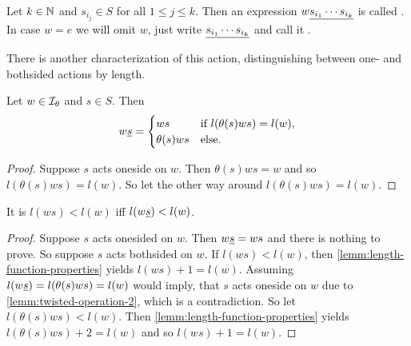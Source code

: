 \begin{defi}
	Let $k \in \mathbb{N}$ and $s_{i_j} \in S$ for all $1 \leq j \leq k$. Then an expression $w \underline{s_{i_1} \cdots s_{i_k}}$ is called . In case $w = e$ we will omit $w$, just write $\underline{s_{i_1} \cdots s_{i_k}}$ and call it .
\end{defi}

There is another characterization of this action, distinguishing between one- and bothsided actions by length.

\begin{lemm}
	Let $w \in \mathcal{I}_{\theta}$ and $s \in S$. Then
	$$ w \underline{s} = \begin{cases}
		ws & \textrm{if } l(\theta(s)ws) = l(w), \\
		\theta(s)ws & \textrm{else}. \\
	\end{cases} $$

	\begin{proof}
		Suppose $s$ acts oneside on $w$. Then $\theta(s)ws = w$ and so $l(\theta(s)ws) = l(w)$. So let the other way around $l(\theta(s)ws) = l(w)$. \todo
	\end{proof}
\end{lemm}

\begin{lemm}
	It is $l(ws) < l(w)$ iff $l(w \underline{s}) < l(w)$.

	\begin{proof}
		Suppose $s$ acts onesided on $w$. Then $w \underline{s} = ws$ and there is nothing to prove. So suppose $s$ acts bothsided on $w$. If $l(ws) < l(w)$, then \ref{lemm:length-function-properties} yields $l(ws) + 1 = l(w)$. Assuming $l(w \underline{s}) = l(\theta(s)ws) = l(w)$ would imply, that $s$ acts oneside on $w$ due to \ref{lemm:twisted-operation-2}, which is a contradiction. So let $l(\theta(s)ws) < l(w)$. Then \ref{lemm:length-function-properties} yields $l(\theta(s)ws) + 2 = l(w)$ and so $l(ws) + 1 = l(w)$.
	\end{proof}
\end{lemm}

